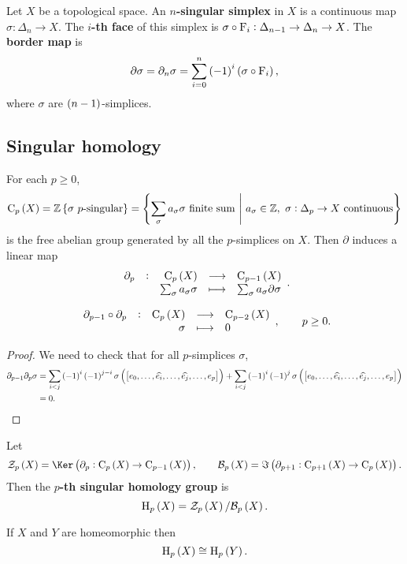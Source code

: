 \begin{definition}
Let $ X $ be a topological space. An \textbf{$ n $-singular simplex} in $ X $ is a continuous map $ \sigma : \Delta_n \to X $. The \textbf{$ i $-th face} of this simplex is $ \sigma \circ \mathrm{F}_i : \Delta_{n - 1} \to \Delta_n \to X $. The \textbf{border map} is
$$ \partial\sigma = \partial_n\sigma = \sum_{i = 0}^n \br{-1}^i\br{\sigma \circ \F_i}, $$
where $ \sigma $ are $ \br{n - 1} $-simplices.
\end{definition}

\subsection{Singular homology}

\begin{definition}
For each $ p \ge 0 $,
$$ \C_p\br{X} = \ZZ\cbr{\sigma \ \text{$ p $-singular}} = \cbr{\sum_\sigma a_\sigma\sigma \ \text{finite sum} \st a_\sigma \in \ZZ, \ \sigma : \Delta_p \to X \ \text{continuous}} $$
is the free abelian group generated by all the $ p $-simplices on $ X $. Then $ \partial $ induces a linear map
$$ \function[\partial_p]{\C_p\br{X}}{\C_{p - 1}\br{X}}{\sum_\sigma a_\sigma\sigma}{\sum_\sigma  a_\sigma\partial\sigma}. $$
\end{definition}

\begin{lemma}
$$ \function[\partial_{p - 1} \circ \partial_p]{\C_p\br{X}}{\C_{p - 2}\br{X}}{\sigma}{0}, \qquad p \ge 0. $$
\end{lemma}

\begin{proof}
We need to check that for all $ p $-simplices $ \sigma $,
\begin{align*}
\partial_{p - 1}\partial_p\sigma
& = \sum_{i < j} \br{-1}^i\br{-1}^{j - i}\sigma\br{\sbr{e_0, \dots, \widehat{e_i}, \dots, \widehat{e_j}, \dots, e_p}} + \sum_{i < j} \br{-1}^i\br{-1}^j\sigma\br{\sbr{e_0, \dots, \widehat{e_i}, \dots, \widehat{e_j}, \dots, e_p}} \\
& = 0.
\end{align*}
\end{proof}

Let
$$ \ZZZ_p\br{X} = \Ker \br{\partial_p : \C_p\br{X} \to \C_{p - 1}\br{X}}, \qquad \BBB_p\br{X} = \Im \br{\partial_{p + 1} : \C_{p + 1}\br{X} \to \C_p\br{X}}. $$
Then the \textbf{$ p $-th singular homology group} is
$$ \H_p\br{X} = \ZZZ_p\br{X} / \BBB_p\br{X}. $$

\begin{exercise*}
If $ X $ and $ Y $ are homeomorphic then
$$ \H_p\br{X} \cong \H_p\br{Y}. $$
\end{exercise*}

